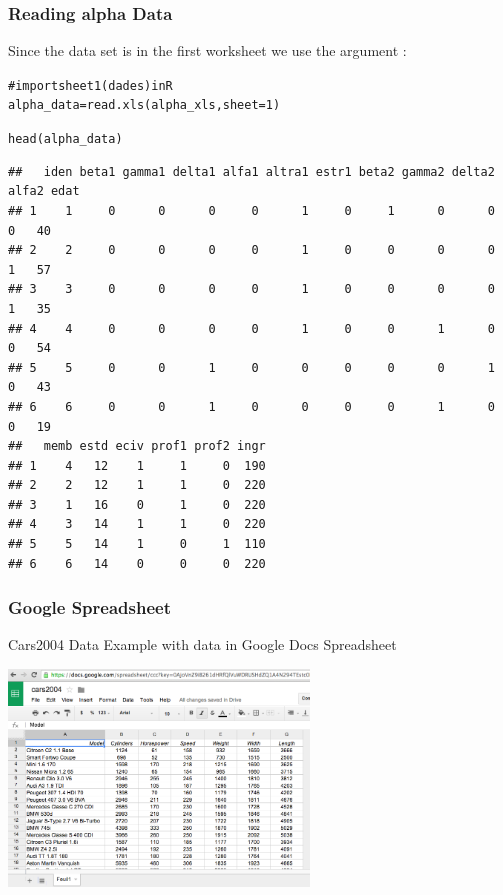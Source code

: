 \documentclass{beamer}\usepackage[]{graphicx}\usepackage[]{color}
\makeatletter
\newcommand{\hlnum}[1]{\textcolor[rgb]{0.063,0.58,0.627}{#1}}%
\newcommand{\hlcom}[1]{\textcolor[rgb]{0.588,0.588,0.588}{#1}}%
\newcommand{\hlstd}[1]{\textcolor[rgb]{0.196,0.196,0.196}{#1}}%
\newcommand{\hlkwb}[1]{\textcolor[rgb]{0.627,0,0.314}{#1}}%
\newcommand{\hlkwc}[1]{\textcolor[rgb]{0,0.631,0.314}{#1}}%
\newcommand{\hlkwd}[1]{\textcolor[rgb]{0.78,0.227,0.412}{#1}}%
\newenvironment{kframe}{%
 \def\at@end@of@kframe{}%
 \ifinner\ifhmode%
  \def\at@end@of@kframe{\end{minipage}}%
  \begin{minipage}{\columnwidth}%
 \fi\fi%
 \def\FrameCommand##1{\hskip\@totalleftmargin \hskip-\fboxsep
 \colorbox{shadecolor}{##1}\hskip-\fboxsep
     \hskip-\linewidth \hskip-\@totalleftmargin \hskip\columnwidth}%
 \MakeFramed {\advance\hsize-\width
   \@totalleftmargin\z@ \linewidth\hsize
   \@setminipage}}%
 {\par\unskip\endMakeFramed%
 \at@end@of@kframe}
\newenvironment{knitrout}{}{} %
\makeatother
\begin{document}
\begin{frame}[fragile]
\frametitle{Reading alpha Data}

Since the data set is in the first worksheet we use the argument :
\begin{knitrout}\tiny
{}\color{fgcolor}\begin{kframe}
\begin{alltt}
\hlcom{# import sheet 1 (dades) in R}
\hlstd{alpha_data} \hlkwb{=} \hlkwd{read.xls}\hlstd{(alpha_xls,} \hlkwc{sheet} \hlstd{=} \hlnum{1}\hlstd{)}

\hlkwd{head}\hlstd{(alpha_data)}
\end{alltt}
\begin{verbatim}
##   iden beta1 gamma1 delta1 alfa1 altra1 estr1 beta2 gamma2 delta2 alfa2 edat
## 1    1     0      0      0     0      1     0     1      0      0     0   40
## 2    2     0      0      0     0      1     0     0      0      0     1   57
## 3    3     0      0      0     0      1     0     0      0      0     1   35
## 4    4     0      0      0     0      1     0     0      1      0     0   54
## 5    5     0      0      1     0      0     0     0      0      1     0   43
## 6    6     0      0      1     0      0     0     0      1      0     0   19
##   memb estd eciv prof1 prof2 ingr
## 1    4   12    1     1     0  190
## 2    2   12    1     1     0  220
## 3    1   16    0     1     0  220
## 4    3   14    1     1     0  220
## 5    5   14    1     0     1  110
## 6    6   14    0     0     0  220
\end{verbatim}
\end{kframe}
\end{knitrout}

\end{frame}


\begin{frame}[fragile]
\frametitle{Google Spreadsheet}

\begin{block}{Cars2004 Data}
Example with data in Google Docs Spreadsheet \\
\begin{center}
\includegraphics[width=8cm]{images/cars2004_data.png}

\end{center}
\end{block}

\end{frame}
\end{document}
